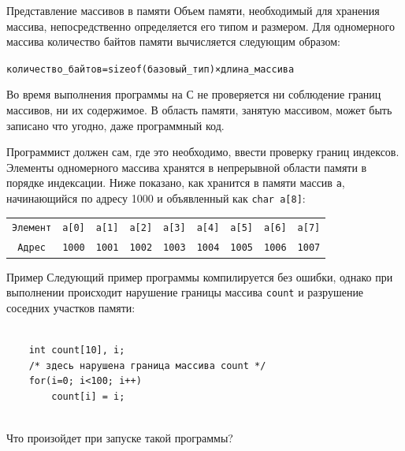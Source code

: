 \documentclass{beamer}
\begin{document}
\begin{frame}{Представление массивов в памяти}
    Объем памяти, необходимый для хранения массива, непосредственно
    определяется его типом и размером. Для одномерного массива количество байтов памяти вычисляется следующим образом:
    
    \begin{alltt}
    количество\_байтов = sizeof(базовый\_тип) × длина\_массива
    \end{alltt}
    
    Во время выполнения программы на С не проверяется ни соблюдение
    границ массивов, ни их содержимое. В область памяти, занятую массивом, может быть записано что угодно, даже программный код. 
    
    \medskip
    
    Программист должен сам, где это необходимо, ввести проверку границ индексов. Элементы одномерного массива хранятся в непрерывной области памяти в порядке индексации. Ниже показано, как хранится в памяти массив \texttt{а}, начинающийся по адресу 1000 и объявленный как \texttt{char a[8]}:
    
    \begin{alltt}
    \begin{tabular}{c c c c c c c c c}
    Элемент & a[0] & a[1] & a[2] & a[3] & a[4] & a[5] & a[6] & a[7] \\

    Адрес &  1000 & 1001 & 1002 & 1003 & 1004 & 1005 & 1006 & 1007
    \end{tabular}
    \end{alltt}
\end{frame}

\begin{frame}[fragile]{Пример}
    Следующий пример программы компилируется без ошибки, однако при выполнении происходит нарушение границы массива \texttt{count} и разрушение соседних участков памяти:
    \medskip
    \begin{verbatim}
    
    int count[10], i;
    /* здесь нарушена граница массива count */
    for(i=0; i<100; i++)
        count[i] = i;
    
    \end{verbatim}
    \medskip
    Что произойдет при запуске такой программы?
\end{frame}
\end{document}
